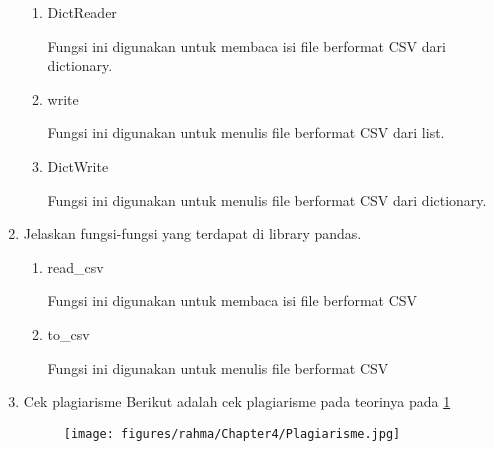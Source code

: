 \begin{enumerate}
\begin{enumerate}
		\item DictReader
		
		Fungsi ini digunakan untuk membaca isi file berformat CSV dari dictionary.
		
		
		
		\item write
		
		Fungsi ini digunakan untuk menulis file berformat CSV dari list.
		
		
		
		\item DictWrite
		
		Fungsi ini digunakan untuk menulis file berformat CSV dari dictionary.
		
		
		
	\end{enumerate}
   \item Jelaskan fungsi-fungsi yang terdapat di library pandas.
       \begin{enumerate}
		\item read\_csv
		
		Fungsi ini digunakan untuk membaca isi file berformat CSV
		
		
		
		\item to\_csv
		
		Fungsi ini digunakan untuk menulis file berformat CSV
		
		
		
	\end{enumerate}
   \item Cek plagiarisme
Berikut adalah cek plagiarisme pada teorinya pada \ref{Plagiarisme}
   \begin{figure}[h]
	\texttt{[image: figures/rahma/Chapter4/Plagiarisme.jpg]}
	\centering
    \label{Plagiarisme}
    \end{figure}

 \end{enumerate} 